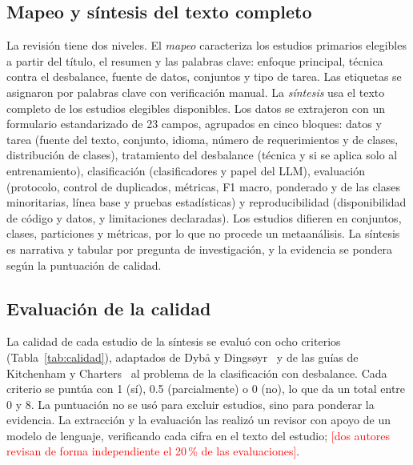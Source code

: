 \documentclass[conference]{IEEEtran}
\newcommand{\pendiente}[1]{\textcolor{red}{[#1]}}
\begin{document}
\subsection{Mapeo y síntesis del texto completo}
La revisión tiene dos niveles. El \emph{mapeo} caracteriza los \nMapeo{} estudios primarios elegibles a partir del título, el resumen y las palabras clave: enfoque principal, técnica contra el desbalance, fuente de datos, conjuntos y tipo de tarea. Las etiquetas se asignaron por palabras clave con verificación manual. La \emph{síntesis} usa el texto completo de los \nSintesis{} estudios elegibles disponibles. Los datos se extrajeron con un formulario estandarizado de 23 campos, agrupados en cinco bloques: datos y tarea (fuente del texto, conjunto, idioma, número de requerimientos y de clases, distribución de clases), tratamiento del desbalance (técnica y si se aplica solo al entrenamiento), clasificación (clasificadores y papel del LLM), evaluación (protocolo, control de duplicados, métricas, F1 macro, ponderado y de las clases minoritarias, línea base y pruebas estadísticas) y reproducibilidad (disponibilidad de código y datos, y limitaciones declaradas). Los estudios difieren en conjuntos, clases, particiones y métricas, por lo que no procede un metaanálisis. La síntesis es narrativa y tabular por pregunta de investigación, y la evidencia se pondera según la puntuación de calidad.

\subsection{Evaluación de la calidad}
La calidad de cada estudio de la síntesis se evaluó con ocho criterios (Tabla~\ref{tab:calidad}), adaptados de Dybå y Dingsøyr~\cite{Dyba2008-Agile} y de las guías de Kitchenham y Charters~\cite{Kitchenham2007-Guidelines} al problema de la clasificación con desbalance. Cada criterio se puntúa con 1 (sí), 0.5 (parcialmente) o 0 (no), lo que da un total entre 0 y 8. La puntuación no se usó para excluir estudios, sino para ponderar la evidencia. La extracción y la evaluación las realizó un revisor con apoyo de un modelo de lenguaje, verificando cada cifra en el texto del estudio; \pendiente{dos autores revisan de forma independiente el 20\,\% de las evaluaciones}.
\end{document}
